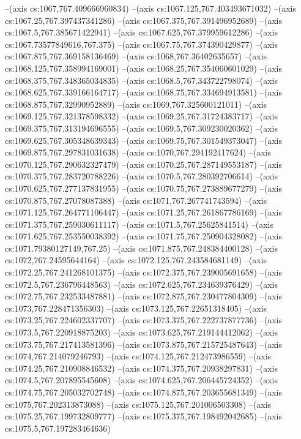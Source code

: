 --(axis cs:1067,767.409666960834)
--(axis cs:1067.125,767.403493671032)
--(axis cs:1067.25,767.397437341286)
--(axis cs:1067.375,767.391496952689)
--(axis cs:1067.5,767.385671422941)
--(axis cs:1067.625,767.379959612286)
--(axis cs:1067.73577849616,767.375)
--(axis cs:1067.75,767.374390429877)
--(axis cs:1067.875,767.369158136469)
--(axis cs:1068,767.36402635657)
--(axis cs:1068.125,767.358994169001)
--(axis cs:1068.25,767.354060601029)
--(axis cs:1068.375,767.348365034835)
--(axis cs:1068.5,767.343722798074)
--(axis cs:1068.625,767.339166164717)
--(axis cs:1068.75,767.334694913581)
--(axis cs:1068.875,767.32990952889)
--(axis cs:1069,767.325600121011)
--(axis cs:1069.125,767.321378598332)
--(axis cs:1069.25,767.31724383717)
--(axis cs:1069.375,767.313194696555)
--(axis cs:1069.5,767.309230020362)
--(axis cs:1069.625,767.305348639343)
--(axis cs:1069.75,767.301549373047)
--(axis cs:1069.875,767.297831031638)
--(axis cs:1070,767.294192417624)
--(axis cs:1070.125,767.290632327479)
--(axis cs:1070.25,767.287149553187)
--(axis cs:1070.375,767.283720788226)
--(axis cs:1070.5,767.280392706614)
--(axis cs:1070.625,767.277137831955)
--(axis cs:1070.75,767.273889677279)
--(axis cs:1070.875,767.27078087388)
--(axis cs:1071,767.267741743594)
--(axis cs:1071.125,767.264771106447)
--(axis cs:1071.25,767.261867786169)
--(axis cs:1071.375,767.259030611117)
--(axis cs:1071.5,767.25625841514)
--(axis cs:1071.625,767.253550038392)
--(axis cs:1071.75,767.250904328082)
--(axis cs:1071.79380127149,767.25)
--(axis cs:1071.875,767.248384400128)
--(axis cs:1072,767.24595644164)
--(axis cs:1072.125,767.243584681149)
--(axis cs:1072.25,767.241268101375)
--(axis cs:1072.375,767.239005691658)
--(axis cs:1072.5,767.236796448563)
--(axis cs:1072.625,767.234639376429)
--(axis cs:1072.75,767.232533487881)
--(axis cs:1072.875,767.230477804309)
--(axis cs:1073,767.228471356303)
--(axis cs:1073.125,767.22651318405)
--(axis cs:1073.25,767.224602337707)
--(axis cs:1073.375,767.222737877736)
--(axis cs:1073.5,767.220918875203)
--(axis cs:1073.625,767.219144412062)
--(axis cs:1073.75,767.217413581396)
--(axis cs:1073.875,767.215725487643)
--(axis cs:1074,767.214079246793)
--(axis cs:1074.125,767.212473986559)
--(axis cs:1074.25,767.210908846532)
--(axis cs:1074.375,767.20938297831)
--(axis cs:1074.5,767.207895545608)
--(axis cs:1074.625,767.206445724352)
--(axis cs:1074.75,767.205032702748)
--(axis cs:1074.875,767.203655681349)
--(axis cs:1075,767.202313873088)
--(axis cs:1075.125,767.201006503308)
--(axis cs:1075.25,767.199732809777)
--(axis cs:1075.375,767.198492042685)
--(axis cs:1075.5,767.197283464636)
